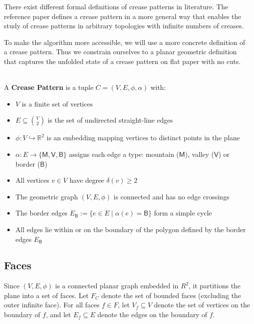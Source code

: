 There exist different formal definitions of crease patterns in literature.
The reference paper defines a crease pattern in a more general way that enables the study of crease patterns in arbitrary topologies with infinite numbers of creases.

To make the algorithm more accessible, we will use a more concrete definition of a crease pattern.
Thus we constrain ourselves to a planar geometric definition that captures the unfolded state of a crease pattern on flat paper with no cuts.

\begin{definition}
~\\
A \textbf{Crease Pattern} is a tuple $C = (V, E, \phi, \alpha)$ with:
\begin{itemize}
    \item $V$ is a finite set of vertices
    \item $E \subseteq \binom{V}{2}$ is the set of undirected straight-line edges
    \item $\phi: V \hookrightarrow \mathbb{R}^2$ is an embedding mapping vertices to distinct points in the plane
    \item $\alpha: E \to \{\mathsf{M}, \mathsf{V}, \mathsf{B}\}$ assigns each edge a type: mountain ($\mathsf{M}$), valley ($\mathsf{V}$) or border ($\mathsf{B}$)
    \item All vertices $v \in V$ have degree $\delta(v) \geq 2$
    \item The geometric graph $(V, E, \phi)$ is connected and has no edge crossings
    \item The border edges $E_{\mathsf{B}} := \{e \in E \mid \alpha(e) = \mathsf{B}\}$ form a simple cycle
    \item All edges lie within or on the boundary of the polygon defined by the border edges $E_{\mathsf{B}}$
\end{itemize}
\end{definition}


\subsection{Faces}
Since $(V,E,\phi)$ is a connected planar graph embedded in $R^2$, it partitions the plane into a set of faces.
Let $F_C$ denote the set of bounded faces (excluding the outer infinite face).
For all faces $f \in F$, let $V_f \subseteq V$ denote the set of vertices on the boundary of $f$, and let $E_f \subseteq E$ denote the edges on the boundary of $f$.

